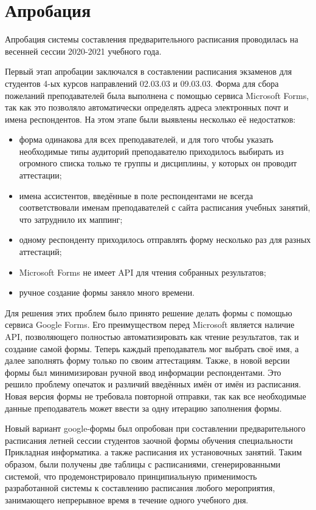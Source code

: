 \section{Апробация} \label{ch4:sec4}
Апробация системы составления предварительного расписания проводилась на весенней сессии 2020-2021 учебного года. 

Первый этап апробации заключался в составлении расписания экзаменов для студентов 4-ых курсов направлений 02.03.03 и 09.03.03. Форма для сбора пожеланий преподавателей была выполнена с помощью сервиса Microsoft Forms, так как это позволяло автоматически определять адреса электронных почт и имена респондентов. На этом этапе были выявлены несколько её недостатков:

\begin{itemize}
	\item форма одинакова для всех преподавателей, и для того чтобы указать необходимые типы аудиторий преподавателю приходилось выбирать из огромного списка только те группы и дисциплины, у которых он проводит аттестации;
	\item имена ассистентов, введённые в поле респондентами не всегда соответствовали именам преподавателей с сайта расписания учебных занятий, что затруднило их маппинг;
	\item одному респонденту приходилось отправлять форму несколько раз для разных аттестаций;
	\item Microsoft Forms не имеет API для чтения собранных результатов;
	\item ручное создание формы заняло много времени.
\end{itemize} 	

Для решения этих проблем было принято решение делать формы с помощью сервиса Google Forms. Его преимуществом перед Microsoft является наличие API, позволяющего полностью автоматизировать как чтение результатов, так и создание самой формы. Теперь каждый преподаватель мог выбрать своё имя, а далее заполнять форму только по своим аттестациям. Также, в новой версии формы был минимизирован ручной ввод информации респондентами. Это решило проблему опечаток и различий введённых имён от имён из расписания. Новая версия формы не требовала повторной отправки, так как все необходимые данные преподаватель может ввести за одну итерацию заполнения формы.

Новый вариант google-формы был опробован при составлении предварительного расписания летней сессии студентов заочной формы обучения специальности Прикладная информатика. 
а также расписания их установочных занятий. Таким образом, были получены две таблицы с расписаниями, сгенерированными системой, что продемонстрировало принципиальную применимость разработанной системы к составлению расписания любого мероприятия, занимающего непрерывное время в течение одного учебного дня. 


